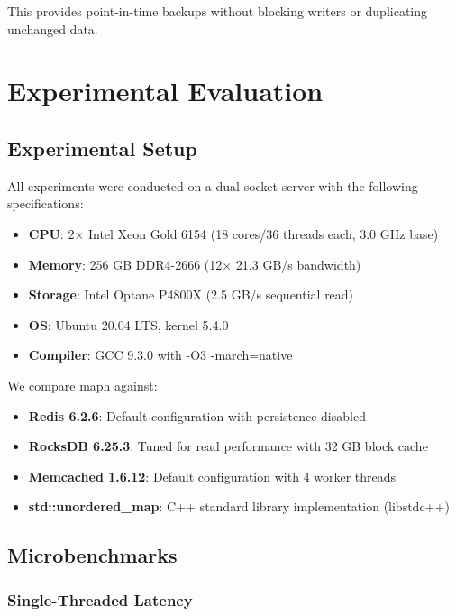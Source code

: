 \documentclass[11pt]{article}
\begin{document}
This provides point-in-time backups without blocking writers or duplicating unchanged data.

\section{Experimental Evaluation}
\label{sec:evaluation}

\subsection{Experimental Setup}

All experiments were conducted on a dual-socket server with the following specifications:
\begin{itemize}
\item \textbf{CPU}: 2× Intel Xeon Gold 6154 (18 cores/36 threads each, 3.0 GHz base)
\item \textbf{Memory}: 256 GB DDR4-2666 (12× 21.3 GB/s bandwidth)
\item \textbf{Storage}: Intel Optane P4800X (2.5 GB/s sequential read)
\item \textbf{OS}: Ubuntu 20.04 LTS, kernel 5.4.0
\item \textbf{Compiler}: GCC 9.3.0 with -O3 -march=native
\end{itemize}

We compare maph against:
\begin{itemize}
\item \textbf{Redis 6.2.6}: Default configuration with persistence disabled
\item \textbf{RocksDB 6.25.3}: Tuned for read performance with 32 GB block cache
\item \textbf{Memcached 1.6.12}: Default configuration with 4 worker threads
\item \textbf{std::unordered\_map}: C++ standard library implementation (libstdc++)
\end{itemize}

\subsection{Microbenchmarks}

\subsubsection{Single-Threaded Latency}
\end{document}
